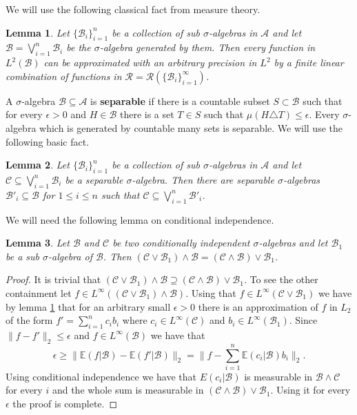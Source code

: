 \documentclass [11pt] {article}
\newtheorem{lemma}{Lemma}[section]
\begin{document}
We will use the following classical fact from measure theory.

\begin{lemma}\label{siggen} Let $\{\mathcal{B}_i\}_{i=1}^n$ be a collection of sub $\sigma$-algebras in $\mathcal{A}$ and let $\mathcal{B}=\bigvee_{i=1}^n\mathcal{B}_i$ be the $\sigma$-algebra generated by them.  Then every function in $L^2(\mathcal{B})$ can be approximated with an arbitrary precision in $L^2$ by a finite linear combination of functions in $\mathcal{R}=\mathcal{R}(\{\mathcal{B}_i\}_{i=1}^\infty)$.
\end{lemma}

A $\sigma$-algebra $\mathcal{B}\subseteq\mathcal{A}$ is {\bf separable} if there is a countable subset $S\subset\mathcal{B}$ such that for every $\epsilon>0$ and $H\in\mathcal{B}$ there is a set $T\in S$ such that $\mu(H\triangle T)\leq\epsilon$. Every $\sigma$-algebra which is generated by countable many sets is separable.
We will use the following basic fact.

\begin{lemma}\label{sepsiggen} Let $\{\mathcal{B}_i\}_{i=1}^n$ be a collection of sub $\sigma$-algebras in $\mathcal{A}$ and let $\mathcal{C}\subseteq\bigvee_{i=1}^n\mathcal{B}_i$ be a separable $\sigma$-algebra. Then there are separable $\sigma$-algebras $\mathcal{B}'_i\subseteq\mathcal{B}$ for $1\leq i\leq n$ such that $\mathcal{C}\subseteq\bigvee_{i=1}^n\mathcal{B}'_i$.
\end{lemma}

We will need the following lemma on conditional independence.

\begin{lemma}\label{siggen2} Let $\mathcal{B}$ and $\mathcal{C}$ be two conditionally independent $\sigma$-algebras and let $\mathcal{B}_1$ be a sub $\sigma$-algebra of $\mathcal{B}$.
Then $(\mathcal{C}\vee\mathcal{B}_1)\wedge\mathcal{B}=(\mathcal{C}\wedge\mathcal{B})\vee\mathcal{B}_1$.
\end{lemma}

\begin{proof}
It is trivial that $(\mathcal{C}\vee\mathcal{B}_1)\wedge\mathcal{B}\supseteq(\mathcal{C}\wedge\mathcal{B})\vee\mathcal{B}_1$.
To see the other containment let $f\in L^\infty((\mathcal{C}\vee\mathcal{B}_1)\wedge\mathcal{B})$.
Using that $f\in L^\infty(\mathcal{C}\vee\mathcal{B}_1)$ we have by lemma \ref{siggen} that for an arbitrary small $\epsilon>0$ there is an approximation of $f$ in $L_2$ of the form $f'=\sum_{i=1}^n c_ib_i$
where $c_i\in L^\infty(\mathcal{C})$ and $b_i\in L^\infty(\mathcal{B}_1)$. Since $\|f-f'\|_2\leq\epsilon$ and $f\in L^\infty(\mathcal{B})$ we have that $$\epsilon\geq\|\mathbb{E}(f|\mathcal{B})-\mathbb{E}(f'|\mathcal{B})\|_2=\|f-\sum_{i=1}^n \mathbb{E}(c_i|\mathcal{B})b_i\|_2.$$
Using conditional independence we have that $E(c_i|\mathcal{B})$ is measurable in $\mathcal{B}\wedge\mathcal{C}$ for every $i$ and the whole sum is measurable in $(\mathcal{C}\wedge\mathcal{B})\vee\mathcal{B}_1$.
Using it for every $\epsilon$ the proof is complete.
\end{proof}
\end{document}
